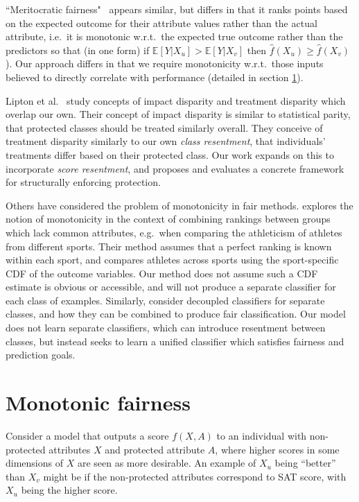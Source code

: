     ``Meritocratic fairness"~\cite{joseph2016} appears similar, but differs in that it ranks points based on the expected outcome for their attribute values rather than the actual attribute, i.e.\ it is monotonic w.r.t.\ the expected true outcome rather than the predictors so that (in one form) if $\mathbb{E}[Y | X_u] > \mathbb{E}[Y | X_v]$ then $\hat{f}(X_u) \ge \hat{f}(X_v)$).  Our approach differs in that we require monotonicity w.r.t.~those inputs believed to directly correlate with performance (detailed in section \ref{sec:defs}).
    
    Lipton et al.~\cite{lipton2018treatmentdisparity} study concepts of impact disparity and treatment disparity which overlap our own. Their concept of impact disparity is similar to statistical parity, that protected classes should be treated similarly overall.  They conceive of treatment disparity similarly to our own {\it class resentment}, that individuals' treatments differ based on their protected class.  Our work expands on this to incorporate {\it score resentment}, and proposes and evaluates a concrete framework for structurally enforcing protection.
    
    Others have considered the problem of monotonicity in fair methods.  \citep{kearns2017meritocratic} explores the notion of monotonicity in the context of combining rankings between groups which lack common attributes, e.g.\ when comparing the athleticism of athletes from different sports.  Their method assumes that a perfect ranking is known within each sport, and compares athletes across sports using the sport-specific CDF of the outcome variables. Our method does not assume such a CDF estimate is obvious or accessible, and will not produce a separate classifier for each class of examples.  Similarly, \citep{dwork2018decoupled} consider decoupled classifiers for separate classes, and how they can be combined to produce fair classification.  Our model does not learn separate classifiers, which can introduce resentment between classes, but instead seeks to learn a unified classifier which satisfies fairness and prediction goals.

\section{Monotonic fairness}\label{sec:defs}

    Consider a model that outputs a score $f(X, A)$ to an individual with non-protected attributes $X$ and protected attribute $A$, where higher scores in some dimensions of $X$ are seen as more desirable.
    An example of $X_u$ being ``better'' than $X_v$ might be if the non-protected attributes correspond to SAT score, with $X_u$ being the higher score. 
    
